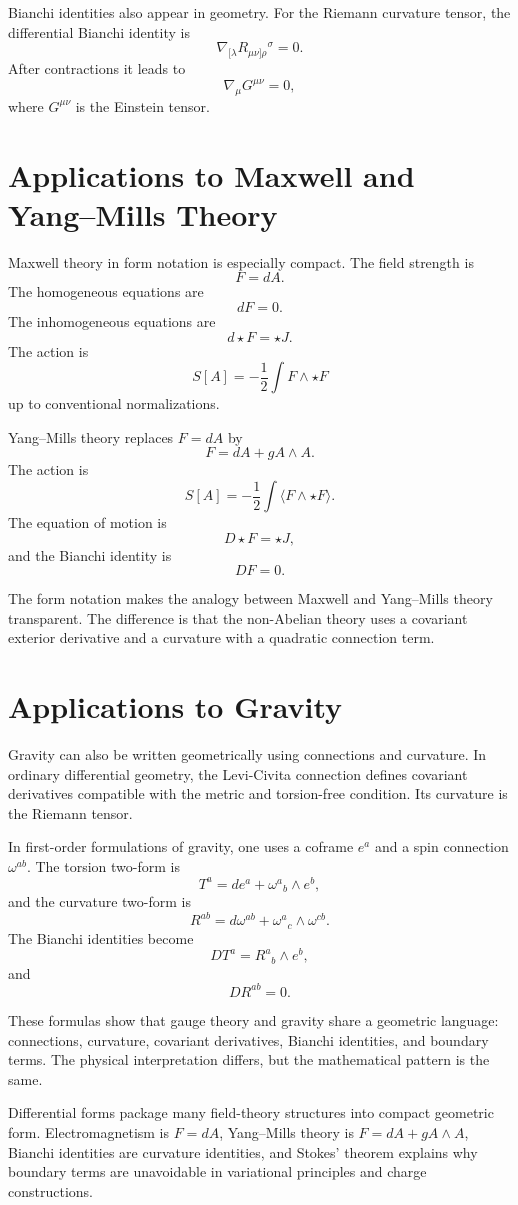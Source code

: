 Bianchi identities also appear in geometry. For the Riemann curvature tensor,
the differential Bianchi identity is
\[
    \nabla_{[\lambda}R_{\mu\nu]\rho}{}^\sigma=0.
\]
After contractions it leads to
\[
    \nabla_\mu G^{\mu\nu}=0,
\]
where \(G^{\mu\nu}\) is the Einstein tensor.

\section{Applications to Maxwell and Yang--Mills Theory}

Maxwell theory in form notation is especially compact. The field strength is
\[
    F=dA.
\]
The homogeneous equations are
\[
    dF=0.
\]
The inhomogeneous equations are
\[
    d\star F=\star J.
\]
The action is
\[
    S[A]=-\frac{1}{2}\int F\wedge\star F
\]
up to conventional normalizations.

Yang--Mills theory replaces \(F=dA\) by
\[
    F=dA+gA\wedge A.
\]
The action is
\[
    S[A]=-\frac{1}{2}\int \langle F\wedge\star F\rangle.
\]
The equation of motion is
\[
    D\star F=\star J,
\]
and the Bianchi identity is
\[
    DF=0.
\]

The form notation makes the analogy between Maxwell and Yang--Mills theory
transparent. The difference is that the non-Abelian theory uses a covariant
exterior derivative and a curvature with a quadratic connection term.

\section{Applications to Gravity}

Gravity can also be written geometrically using connections and curvature. In
ordinary differential geometry, the Levi-Civita connection defines covariant
derivatives compatible with the metric and torsion-free condition. Its curvature
is the Riemann tensor.

In first-order formulations of gravity, one uses a coframe \(e^a\) and a spin
connection \(\omega^{ab}\). The torsion two-form is
\[
    T^a=de^a+\omega^a{}_b\wedge e^b,
\]
and the curvature two-form is
\[
    R^{ab}=d\omega^{ab}+\omega^a{}_c\wedge\omega^{cb}.
\]
The Bianchi identities become
\[
    DT^a=R^a{}_b\wedge e^b,
\]
and
\[
    DR^{ab}=0.
\]

These formulas show that gauge theory and gravity share a geometric language:
connections, curvature, covariant derivatives, Bianchi identities, and boundary
terms. The physical interpretation differs, but the mathematical pattern is the
same.

\begin{summarybox}
Differential forms package many field-theory structures into compact geometric
form. Electromagnetism is \(F=dA\), Yang--Mills theory is
\(F=dA+gA\wedge A\), Bianchi identities are curvature identities, and Stokes'
theorem explains why boundary terms are unavoidable in variational principles
and charge constructions.
\end{summarybox}
